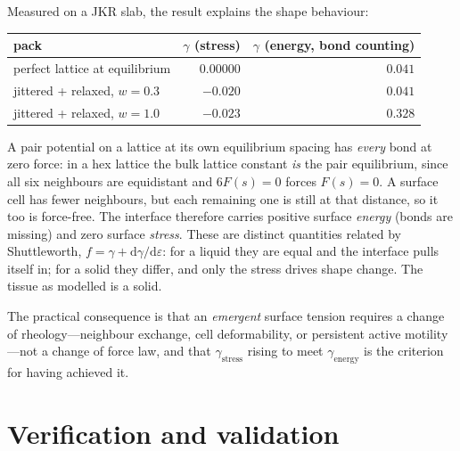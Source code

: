 \documentclass[11pt]{article}
\begin{document}
Measured on a JKR slab, the result explains the shape behaviour:
\begin{center}
\begin{tabular}{lrr}
\toprule
pack & $\gamma$ (stress) & $\gamma$ (energy, bond counting) \\ \midrule
perfect lattice at equilibrium & $0.00000$ & $0.041$ \\
jittered + relaxed, $w=0.3$    & $-0.020$  & $0.041$ \\
jittered + relaxed, $w=1.0$    & $-0.023$  & $0.328$ \\
\bottomrule
\end{tabular}
\end{center}

A pair potential on a lattice at its own equilibrium spacing has \emph{every}
bond at zero force: in a hex lattice the bulk lattice constant \emph{is} the pair
equilibrium, since all six neighbours are equidistant and $6F(s)=0$ forces
$F(s)=0$. A surface cell has fewer neighbours, but each remaining one is still at
that distance, so it too is force-free. The interface therefore carries positive
surface \emph{energy} (bonds are missing) and zero surface \emph{stress}. These
are distinct quantities related by Shuttleworth,
$f=\gamma+\mathrm{d}\gamma/\mathrm{d}\varepsilon$: for a liquid they are equal and
the interface pulls itself in; for a solid they differ, and only the stress drives
shape change. The tissue as modelled is a solid.

The practical consequence is that an \emph{emergent} surface tension requires a
change of rheology---neighbour exchange, cell deformability, or persistent active
motility---not a change of force law, and that $\gamma_{\text{stress}}$ rising to
meet $\gamma_{\text{energy}}$ is the criterion for having achieved it.

\section{Verification and validation}\label{sec:vv}
\end{document}
